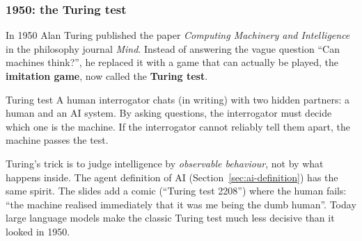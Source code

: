 \subsubsection{1950: the Turing test}

In 1950 Alan Turing published the paper \emph{Computing Machinery and Intelligence} in the
philosophy journal \emph{Mind}. Instead of answering the vague question ``Can machines
think?'', he replaced it with a game that can actually be played, the
\textbf{imitation game}, now called the \textbf{Turing test}.

\begin{nbdef}{Turing test}
A human interrogator chats (in writing) with two hidden partners: a human and an AI system.
By asking questions, the interrogator must decide which one is the machine. If the
interrogator cannot reliably tell them apart, the machine passes the test.
\end{nbdef}

\begin{center}
\end{center}

\begin{nbintuition}
Turing's trick is to judge intelligence by \emph{observable behaviour}, not by what happens
inside. The agent definition of AI (Section~\ref{sec:ai-definition}) has the same spirit.
The slides add a comic (``Turing test 2208'') where the human fails: ``the machine realised
immediately that it was me being the dumb human''. Today large language models make the
classic Turing test much less decisive than it looked in 1950.
\end{nbintuition}

